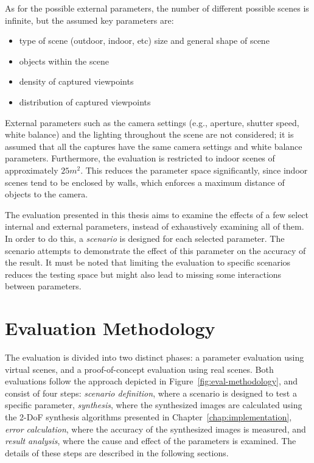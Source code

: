 As for the possible external parameters, the number of different possible scenes is infinite, but the assumed key parameters are:
\begin{itemize}
  \item type of scene (outdoor, indoor, etc) \ar size and general shape of scene
  \item objects within the scene
  \item density of captured viewpoints
  \item distribution of captured viewpoints
\end{itemize}

External parameters such as the camera settings (e.g., aperture, shutter speed, white balance) and the lighting throughout the scene are not considered; it is assumed that all the captures have the same camera settings and white balance parameters. Furthermore, the evaluation is restricted to indoor scenes of approximately $25m^2$. This reduces the parameter space significantly, since indoor scenes tend to be enclosed by walls, which enforces a maximum distance of objects to the camera.

The evaluation presented in this thesis aims to examine the effects of a few select internal and external parameters, instead of exhaustively examining all of them. In order to do this, a \emph{scenario} is designed for each selected parameter. The scenario attempts to demonstrate the effect of this parameter on the accuracy of the result. It must be noted that limiting the evaluation to specific scenarios reduces the testing space but might also lead to missing some interactions between parameters.


\section{Evaluation Methodology} \label{sec:eval_methodology}
The evaluation is divided into two distinct phases: a parameter evaluation using virtual scenes, and a proof-of-concept evaluation using real scenes. Both evaluations follow the approach depicted in Figure~\ref{fig:eval-methodology}, and consist of four steps: \emph{scenario definition}, where a scenario is designed to test a specific parameter, \emph{synthesis}, where the synthesized images are calculated using the 2-DoF synthesis algorithms presented in Chapter~\ref{chap:implementation}, \emph{error calculation}, where the accuracy of the synthesized images is measured, and \emph{result analysis}, where the cause and effect of the parameters is examined. The details of these steps are described in the following sections.

